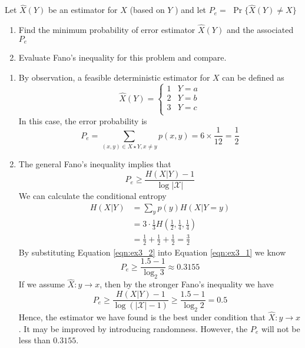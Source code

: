 \begin{exercise}[Fano]
{  Let $\hat{X}(Y)$ be an estimator for $X$ (based on $Y$ ) and let $P_{e}=$ $\operatorname{Pr}\{\hat{X}(Y) \neq X\}$
  \begin{enumerate}
    \item Find the minimum probability of error estimator $\hat{X}(Y)$ and the associated $P_{e}$
    \item Evaluate Fano's inequality for this problem and compare.
  \end{enumerate}
  }
  \begin{solution}
    \begin{enumerate}
      \item {
        By observation, a feasible deterministic estimator for $X$ can be defined as
        \begin{equation}
          \hat{X}(Y) = \left\{\begin{array}{ll}
            1 & Y = a \\
            2 & Y = b \\
            3 & Y = c \\           
          \end{array}  \right.
        \end{equation}
        In this case, the error probability is 
        $$ P_e = \sum_{(x,y)\in {X \star Y}, x \neq y} p(x,y) = 6 \times \frac{1}{12} = \frac{1}{2}$$
      }
      \item {
        The general Fano's inequality implies that
      \begin{equation}P_{e} \geqslant \frac{H(X | Y)-1}{\log |\mathcal{X}|} \label{eqn:ex3_1}\end{equation}
        We can calculate the conditional entropy
        \begin{equation}
          \begin{aligned}
            H(X|Y) &= \sum_{y} p(y) H(X|Y=y) \\
            &= 3 \cdot \frac{1}{3} H(\frac{1}{2},\frac{1}{4},\frac{1}{4}) \\
            &=  \frac{1}{2} +  \frac{1}{2} +  \frac{1}{2} = \frac{3}{2}
          \end{aligned}
          \label{eqn:ex3_2}
        \end{equation}
        By substituting Equation \ref{eqn:ex3_2} into Equation \ref{eqn:ex3_1} we know
        $$P_e \ge \frac{1.5 - 1}{\log_2 3} \approx 0.3155$$
        If we assume $\hat{X}: y \rightarrow x$, then by the stronger Fano's inequality we have
        $$P_e \ge \frac{H(X | Y)-1}{\log (|\mathcal{X}|-1)} \ge \frac{1.5 - 1}{\log_2 2} = 0.5$$
        Hence, the estimator we have found is the best under condition that $\hat{X}: y \rightarrow x$. It may be improved by introducing randomness. However, the $P_e$ will not be less than $0.3155$.
      }
    \end{enumerate}
  \end{solution}
  \label{ex31-3}
\end{exercise}


